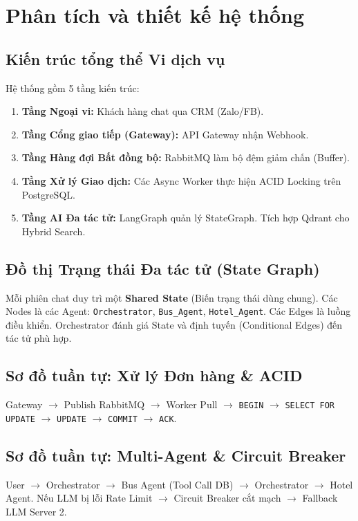 \section{Phân tích và thiết kế hệ thống}

\subsection{Kiến trúc tổng thể Vi dịch vụ}
Hệ thống gồm 5 tầng kiến trúc:
\begin{enumerate}
    \item \textbf{Tầng Ngoại vi:} Khách hàng chat qua CRM (Zalo/FB).
    \item \textbf{Tầng Cổng giao tiếp (Gateway):} API Gateway nhận Webhook.
    \item \textbf{Tầng Hàng đợi Bất đồng bộ:} RabbitMQ làm bộ đệm giảm chấn (Buffer).
    \item \textbf{Tầng Xử lý Giao dịch:} Các Async Worker thực hiện ACID Locking trên PostgreSQL.
    \item \textbf{Tầng AI Đa tác tử:} LangGraph quản lý StateGraph. Tích hợp Qdrant cho Hybrid Search.
\end{enumerate}

\subsection{Đồ thị Trạng thái Đa tác tử (State Graph)}
Mỗi phiên chat duy trì một \textbf{Shared State} (Biến trạng thái dùng chung).
Các Nodes là các Agent: \texttt{Orchestrator}, \texttt{Bus\_Agent}, \texttt{Hotel\_Agent}.
Các Edges là luồng điều khiển. Orchestrator đánh giá State và định tuyến (Conditional Edges) đến tác tử phù hợp.

\subsection{Sơ đồ tuần tự: Xử lý Đơn hàng \& ACID}
Gateway $\rightarrow$ Publish RabbitMQ $\rightarrow$ Worker Pull $\rightarrow$ \texttt{BEGIN} $\rightarrow$ \texttt{SELECT FOR UPDATE} $\rightarrow$ \texttt{UPDATE} $\rightarrow$ \texttt{COMMIT} $\rightarrow$ \texttt{ACK}.

\subsection{Sơ đồ tuần tự: Multi-Agent \& Circuit Breaker}
User $\rightarrow$ Orchestrator $\rightarrow$ Bus Agent (Tool Call DB) $\rightarrow$ Orchestrator $\rightarrow$ Hotel Agent.
Nếu LLM bị lỗi Rate Limit $\rightarrow$ Circuit Breaker cắt mạch $\rightarrow$ Fallback LLM Server 2.
